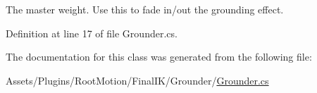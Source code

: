 The master weight. Use this to fade in/out the grounding effect. 



Definition at line 17 of file Grounder.\+cs.



The documentation for this class was generated from the following file\+:\begin{DoxyCompactItemize}
\item 
Assets/\+Plugins/\+Root\+Motion/\+Final\+I\+K/\+Grounder/\mbox{\hyperlink{_grounder_8cs}{Grounder.\+cs}}\end{DoxyCompactItemize}

